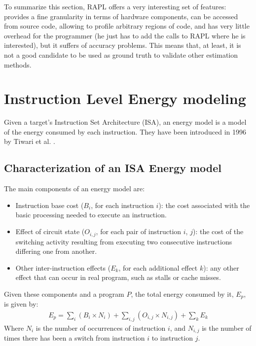\par To summarize this section, RAPL offers a very interesting set of features: provides a fine granularity in terms of hardware components, can be accessed from source code, allowing to profile arbitrary regions of code, and has very little overhead for the programmer (he just has to add the calls to RAPL where he is interested), but it suffers of accuracy problems. This means that, at least, it is not a good candidate to be used as ground truth to validate other estimation methods.

\section{Instruction Level Energy modeling}
Given a target's Instruction Set Architecture (ISA), an energy model is a model of the energy consumed by each instruction.
They have been introduced in 1996 by Tiwari et al. \cite{tiwari}. 
\subsection{Characterization of an ISA Energy model}
The main components of an energy model are:
\begin{itemize}
\item Instruction base cost ($B_{i}$, for each instruction $i$): the cost associated with the basic processing needed to execute an instruction. 
\item Effect of circuit state ($O_{i,j}$, for each pair of instruction $i$, $j$): the cost of the switching activity resulting from executing two consecutive instructions differing one from another.
\item Other inter-instruction effects ($E_{k}$, for each additional effect $k$): any other effect that can occur in real program, such as stalls or cache misses.
\end{itemize}
\par Given these components and a program $P$, the total energy consumed by it, $E_{p}$, is given by:
\begin{gather*}
E_{p} = \sum_{i} (B_{i} \times N_{i}) + \sum_{i,j} (O_{i,j} \times N_{i,j}) + \sum_{k} E_{k}
\end{gather*}
Where $N_{i}$ is the number of occurrences of instruction $i$, and $N_{i,j}$ is the number of times there has been a switch from instruction $i$ to instruction $j$.

